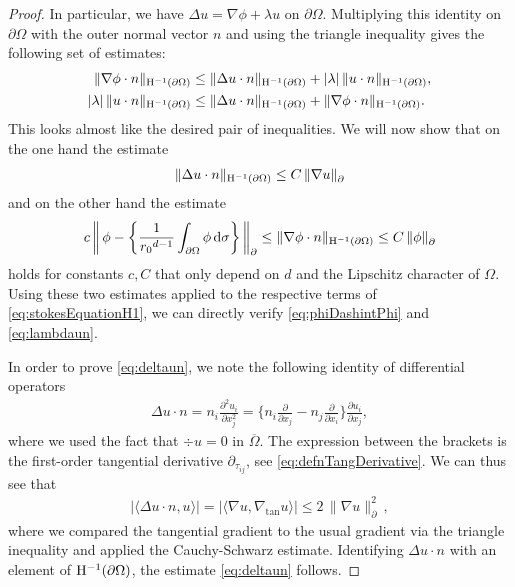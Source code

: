 \begin{proof}
  In particular, we have $\Delta u = \nabla \phi + \lambda u$  on $\partial\Omega$.
  Multiplying this identity  on $\partial\Omega$ with the outer normal vector $n$ and using the triangle inequality gives the following set of estimates:
  \begin{align}
    \label{eq:stokesEquationH1}
    \begin{alignedat}{1}
    \|\nabla \phi \cdot n\|_{\mathrm{H}^{-1}(\partial\Omega)} 
    &\leq \|\Delta u \cdot n \|_{\mathrm{H}^{-1}(\partial\Omega)} + |\lambda|\, \| u\cdot n\|_{\mathrm{H}^{-1}(\partial\Omega)}, \\
    |\lambda|\, \| u\cdot n \|_{\mathrm{H}^{-1}(\partial\Omega)} 
    &\leq \|\Delta u \cdot n \|_{\mathrm{H}^{-1}(\partial\Omega)} + \|\nabla \phi \cdot n \|_{\mathrm{H}^{-1}(\partial\Omega)}.
    \end{alignedat}
  \end{align}
  This looks almost like the desired pair of inequalities.
  We will now show that on the one hand the estimate
  \begin{align}
    \label{eq:deltaun}
    \|\Delta u \cdot n\|_{\mathrm{H}^{-1}(\partial\Omega)}
    \leq C\, \|\nabla u\|^{}_\partial
  \end{align}
  and on the other hand the estimate
  \begin{align}
    \label{eq:nablaPhin}
    c \, \bigg\|\,\phi - \bigg\{ \frac{1}{{r_0}^{d - 1}}\int_{\partial\Omega} \phi \, {\operatorname{d}\!{\sigma}} \bigg\} \, \bigg\|^{}_\partial 
    \leq \|\nabla \phi \cdot n\|_{\mathrm{H}^{-1}(\partial\Omega)}
    \leq C\,  \|\phi\|^{}_\partial
  \end{align}
  holds for constants $c, C$ that only depend on $d$ and the Lipschitz character of $\Omega$.
  Using these two estimates applied to the respective terms of \eqref{eq:stokesEquationH1}, we can directly verify \eqref{eq:phiDashintPhi} and \eqref{eq:lambdaun}.

  In order to prove \eqref{eq:deltaun}, we note the following identity of differential operators
  \begin{align*}
    \Delta u \cdot n = n_i \frac{\partial^2 u_i}{\partial x_j^2} = \Big\{ n_i \frac{\partial}{\partial x_j} - n_j \frac{\partial}{\partial x_i} \Big\} \frac{\partial u_i}{\partial x_j},
  \end{align*}
  where we used the fact that $\div u = 0$ in $\overline \Omega$.
  The expression between the brackets is the first-order tangential derivative $\partial_{\tau_{ij}}$, see \eqref{eq:defnTangDerivative}. 
  We can thus see that
  \begin{align*}
    \big| \langle \Delta u \cdot n, u \rangle \big| = \big| \langle \nabla u, \nabla_{\mathrm{tan}} u \rangle\big| \leq 2\, \|\nabla u\|_\partial^2\,,
  \end{align*}
  where we compared the tangential gradient to the usual gradient via the triangle inequality and applied the Cauchy-Schwarz estimate.  
  Identifying $\Delta u \cdot n$ with an element of $\mathrm{H}^{-1}(\partial\Omega)$, the estimate \eqref{eq:deltaun} follows. 


\end{proof}
